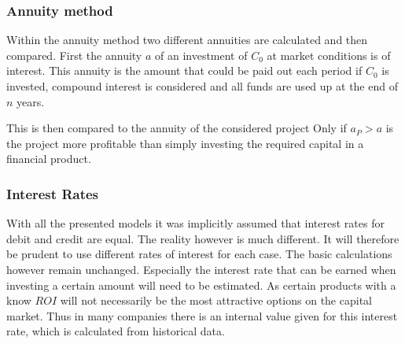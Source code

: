         \subsubsection{Annuity method}
            Within the annuity method two different annuities are calculated and then compared. First the annuity $a$
            of an investment of $C_0$ at market conditions is of interest.
            This annuity is the amount that could be paid out each period if $C_0$ is invested, compound interest
            is considered and all funds are used up at the end of $n$ years.

            This is then compared to the annuity of the considered project
            Only if $a_P > a$ is the project more profitable than simply investing the required capital in a
            financial product.

        \subsubsection{Interest Rates}
            With all the presented models it was implicitly assumed that interest rates for debit and credit are
            equal. The reality however is much different. It will therefore be prudent to use different rates of interest
            for each case. The basic calculations however remain unchanged. Especially the interest rate that can be
            earned when investing a certain amount will need to be estimated. As certain products with a know $ROI$
            will not necessarily be the most attractive options on the capital market. Thus in many companies
            there is an internal value given for this interest rate, which is calculated from historical data.

